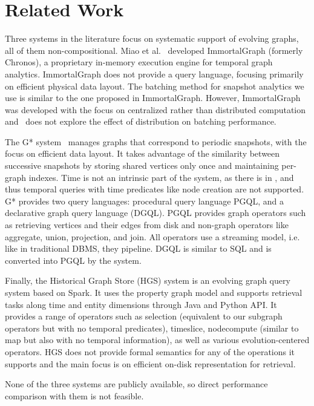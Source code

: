 \section{Related Work}
\label{sec:related}

Three systems in the literature focus on systematic support of
evolving graphs, all of them non-compositional.  Miao et
al.~\cite{Miao2015} developed ImmortalGraph (formerly Chronos), a
proprietary in-memory execution engine for temporal graph analytics.
ImmortalGraph does not provide a query language, focusing primarily on
efficient physical data layout.  The batching method for snapshot
analytics we use is similar to the one proposed in ImmortalGraph.
However, ImmortalGraph was developed with the focus on centralized
rather than distributed computation and~\cite{Miao2015} does not
explore the effect of distribution on batching performance.

The G* system~\cite{Labouseur2015} manages graphs that correspond to
periodic snapshots, with the focus on efficient data layout.  It takes
advantage of the similarity between successive snapshots by storing
shared vertices only once and maintaining per-graph indexes.  Time is
not an intrinsic part of the system, as there is in \tga, and thus
temporal queries with time predicates like node creation are not
supported.  G* provides two query languages: procedural query language
PGQL, and a declarative graph query language (DGQL). PGQL provides
graph operators such as retrieving vertices and their edges from disk
and non-graph operators like aggregate, union, projection, and join.
All operators use a streaming model, i.e. like in traditional DBMS,
they pipeline.  DGQL is similar to SQL and is converted into PGQL by
the system.

Finally, the Historical Graph Store (HGS) system is an evolving graph
query system based on Spark.  It uses the property graph model and
supports retrieval tasks along time and entity dimensions through Java
and Python API.  It provides a range of operators such as selection
(equivalent to our subgraph operators but with no temporal
predicates), timeslice, nodecompute (similar to map but also with no
temporal information), as well as various evolution-centered
operators.  HGS does not provide formal semantics for any of the
operations it supports and the main focus is on efficient on-disk
representation for retrieval.

None of the three systems are publicly available, so direct
performance comparison with them is not feasible.

